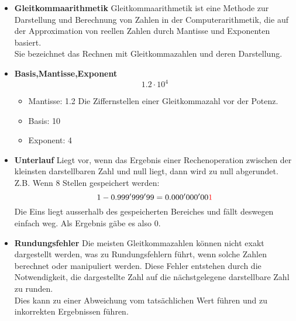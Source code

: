 \documentclass [final]{article}
\theoremstyle{definition}
\begin{document}
\begin{itemize}
	\item {\bfseries Gleitkommaarithmetik} \linebreak
	Gleitkommaarithmetik ist eine Methode zur Darstellung und Berechnung von Zahlen in der Computerarithmetik, die auf der Approximation von reellen Zahlen durch Mantisse und Exponenten basiert. \\
	Sie bezeichnet das Rechnen mit Gleitkommazahlen und deren Darstellung.
	\item {\bfseries Basis,Mantisse,Exponent} \linebreak
	\begin{displaymath}
		1.2 \cdot 10^4
	\end{displaymath}
		\begin{itemize}
			\item Mantisse: 1.2 \newline
			Die Ziffernstellen einer Gleitkommazahl vor der Potenz.
			\item Basis: 10
			\item Exponent: 4
		\end{itemize}
	\item {\bfseries Unterlauf} \linebreak
	Liegt vor, wenn das Ergebnis einer Rechenoperation zwischen der kleinsten darstellbaren Zahl und null liegt, dann wird zu null abgerundet. \\
	Z.B. Wenn 8 Stellen gespeichert werden:
	\begin{displaymath}
		1-0.999'999'99 = 0.000'000'00 {\color{red} 1}
	\end{displaymath}
	Die Eins liegt ausserhalb des gespeicherten Bereiches und fällt deswegen einfach weg. Als Ergebnis gäbe es also  0.
		
	\item {\bfseries Rundungsfehler} \linebreak
	Die meisten Gleitkommazahlen können nicht exakt dargestellt werden, was zu Rundungsfehlern führt, wenn solche Zahlen berechnet oder manipuliert werden. Diese Fehler entstehen durch die Notwendigkeit, die dargestellte Zahl auf die nächstgelegene darstellbare Zahl zu runden. \\
	Dies kann zu einer Abweichung vom tatsächlichen Wert führen und zu inkorrekten Ergebnissen führen.

\end{itemize}
\end{document}
